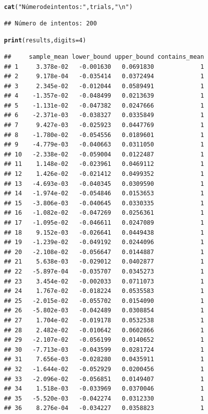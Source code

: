 \documentclass[12pt]{article}\usepackage[]{graphicx}\usepackage[]{xcolor}
\makeatletter
\newcommand{\hlnum}[1]{\textcolor[rgb]{0.686,0.059,0.569}{#1}}%
\newcommand{\hlsng}[1]{\textcolor[rgb]{0.192,0.494,0.8}{#1}}%
\newcommand{\hldef}[1]{\textcolor[rgb]{0.345,0.345,0.345}{#1}}%
\newcommand{\hlkwc}[1]{\textcolor[rgb]{0.333,0.667,0.333}{#1}}%
\newcommand{\hlkwd}[1]{\textcolor[rgb]{0.737,0.353,0.396}{\textbf{#1}}}%
\newenvironment{kframe}{%
 \def\at@end@of@kframe{}%
 \ifinner\ifhmode%
  \def\at@end@of@kframe{\end{minipage}}%
  \begin{minipage}{\columnwidth}%
 \fi\fi%
 \def\FrameCommand##1{\hskip\@totalleftmargin \hskip-\fboxsep
 \colorbox{shadecolor}{##1}\hskip-\fboxsep
     \hskip-\linewidth \hskip-\@totalleftmargin \hskip\columnwidth}%
 \MakeFramed {\advance\hsize-\width
   \@totalleftmargin\z@ \linewidth\hsize
   \@setminipage}}%
 {\par\unskip\endMakeFramed%
 \at@end@of@kframe}
\newenvironment{knitrout}{}{} %
\makeatother
\begin{document}
\begin{knitrout}
\begin{kframe}
\begin{alltt}
\hlkwd{cat}\hldef{(}\hlsng{"Número de intentos:"}\hldef{, trials,} \hlsng{"\textbackslash{}n"}\hldef{)}
\end{alltt}
\begin{verbatim}
## Número de intentos: 200
\end{verbatim}
\begin{alltt}
\hlkwd{print}\hldef{(results,} \hlkwc{digits}\hldef{=} \hlnum{4}\hldef{)}
\end{alltt}
\begin{verbatim}
##     sample_mean lower_bound upper_bound contains_mean
## 1     3.378e-02   -0.001630   0.0691830             1
## 2     9.178e-04   -0.035414   0.0372494             1
## 3     2.345e-02   -0.012044   0.0589491             1
## 4    -1.357e-02   -0.048499   0.0213639             1
## 5    -1.131e-02   -0.047382   0.0247666             1
## 6    -2.371e-03   -0.038327   0.0335849             1
## 7     9.427e-03   -0.025923   0.0447769             1
## 8    -1.780e-02   -0.054556   0.0189601             1
## 9    -4.779e-03   -0.040663   0.0311050             1
## 10   -2.338e-02   -0.059004   0.0122487             1
## 11    1.148e-02   -0.023961   0.0469112             1
## 12    1.426e-02   -0.021412   0.0499352             1
## 13   -4.693e-03   -0.040345   0.0309590             1
## 14   -1.974e-02   -0.054846   0.0153653             1
## 15   -3.806e-03   -0.040645   0.0330335             1
## 16   -1.082e-02   -0.047269   0.0256361             1
## 17   -1.095e-02   -0.046611   0.0247089             1
## 18    9.152e-03   -0.026641   0.0449438             1
## 19   -1.239e-02   -0.049192   0.0244096             1
## 20   -2.108e-02   -0.056647   0.0144887             1
## 21    5.638e-03   -0.029012   0.0402877             1
## 22   -5.897e-04   -0.035707   0.0345273             1
## 23    3.454e-02   -0.002033   0.0711073             1
## 24    1.767e-02   -0.018224   0.0535583             1
## 25   -2.015e-02   -0.055702   0.0154090             1
## 26   -5.802e-03   -0.042489   0.0308854             1
## 27    1.704e-02   -0.019178   0.0532538             1
## 28    2.482e-02   -0.010642   0.0602866             1
## 29   -2.107e-02   -0.056199   0.0140652             1
## 30   -7.713e-03   -0.043599   0.0281724             1
## 31    7.656e-03   -0.028280   0.0435911             1
## 32   -1.644e-02   -0.052929   0.0200456             1
## 33   -2.096e-02   -0.056851   0.0149407             1
## 34    1.518e-03   -0.033969   0.0370046             1
## 35   -5.520e-03   -0.042274   0.0312330             1
## 36    8.276e-04   -0.034227   0.0358823             1

\end{verbatim}
\end{kframe}
\end{knitrout}
\end{document}
